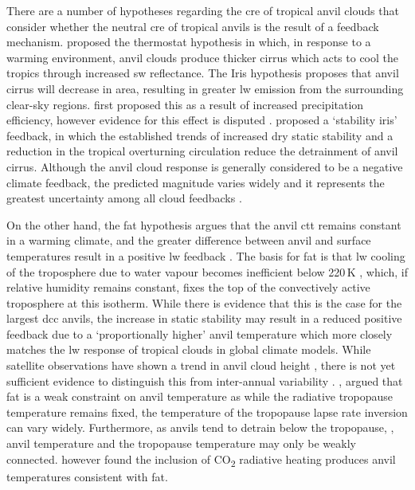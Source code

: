 There are a number of hypotheses regarding the \acrshort{cre} of tropical anvil clouds that consider whether the neutral \acrshort{cre} of tropical anvils is the result of a feedback mechanism. 
\citet{ramanathan_cloud-radiative_1989} proposed the thermostat hypothesis in which, in response to a warming environment, anvil clouds produce thicker cirrus which acts to cool the tropics through increased \acrshort{sw} reflectance. 
The Iris hypothesis proposes that anvil cirrus will decrease in area, resulting in greater \acrshort{lw} emission from the surrounding clear-sky regions.
\citet{lindzen_does_2001} first proposed this as a result of increased precipitation efficiency, however evidence for this effect is disputed \citep{genio_climatic_2002, lin_examination_2004}.
\citet{bony_thermodynamic_2016} proposed a `stability iris' feedback, in which the established trends of increased dry static stability \citep{held_robust_2006} and a reduction in the tropical overturning circulation \citep{vecchi_global_2007} reduce the detrainment of anvil cirrus.
Although the anvil cloud response is generally considered to be a negative climate feedback, the predicted magnitude varies widely and it represents the greatest uncertainty among all cloud feedbacks \citep{sherwood_assessment_2020}.

On the other hand, the \acrfull{fat} hypothesis argues that the anvil \acrfull{ctt} remains constant in a warming climate, and the greater difference between anvil and surface temperatures result in a positive \acrshort{lw} feedback \citep{hartmann_important_2002}.
The basis for \acrfull{fat} is that \acrshort{lw} cooling of the troposphere due to water vapour becomes inefficient below 220\,\unit{K} \citep{jeevanjee_simple_2020}, which, if relative humidity remains constant, fixes the top of the convectively active troposphere at this isotherm. 
While there is evidence that this is the case for the largest \acrshort{dcc} anvils, the increase in static stability may result in a reduced positive feedback due to a `proportionally higher' anvil temperature \citep{zelinka_why_2010} which more closely matches the \acrshort{lw} response of tropical clouds in global climate models.
While satellite observations have shown a trend in anvil cloud height \citep{norris_evidence_2016}, there is not yet sufficient evidence to distinguish this from inter-annual variability \citep{takahashi_when_2019}.
\citet{seeley_fat_2019}, argued that \acrshort{fat} is a weak constraint on anvil temperature as while the radiative tropopause temperature remains fixed, the temperature of the tropopause lapse rate inversion can vary widely. 
Furthermore, as anvils tend to detrain below the tropopause, \citep{takahashi_level_2017, wang_observational_2020}, anvil temperature and the tropopause temperature may only be weakly connected.
\citet{seidel_temperatures_2022} however found the inclusion of CO\textsubscript{2} radiative heating produces anvil temperatures consistent with \acrshort{fat}.

